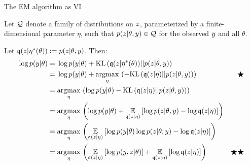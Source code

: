 \begin{frame}{The EM algorithm as VI}

Let $\mathcal{Q}$ denote a family of distributions on $z$, parameterized by a
finite-dimensional parameter $\eta$, such that $p(z | \theta, y) \in \mathcal{Q}$
for the observed $y$ and all $\theta$.

Let $\mathfrak{q}(z | \eta^{*}(\theta)) := p(z | \theta, y)$.  Then:
%
\begin{align*}
%
\log p(\y | \theta) ={}&
\log p(\y | \theta) + \kl{\q(\z | \etaopt(\theta))}{p(\z | \theta, \y)}
\\={}&
\log p(\y | \theta) + \argmax{\eta}\left( -
    \kl{\q(\z | \eta)}{p(\z | \theta, \y)} \right) & \bigstar
\\={}&
\argmax{\eta} \left(
    \log p(\y | \theta) -
    \kl{\q(\z | \eta)}{p(\z | \theta, \y)}\right)
\\={}&
\argmax{\eta} \left(
\log p(\y | \theta) +
\expect{\q(\z | \eta)}{
    \log p(\z | \theta, \y) - \log \q(\z | \eta)
}\right)
\\={}&
\argmax{\eta} \left(
\expect{\q(\z | \eta)}{
    \log p(\y | \theta)
    \log p(\z | \theta, \y) -  \log \q(\z | \eta)
}\right)
\\={}&
\argmax{\eta} \left(
\expect{\q(\z | \eta)}{
    \log p(\y, \z | \theta) }
+ \expect{\q(\z | \eta)}{\log \q(\z | \eta)
}\right) & \bigstar\bigstar
%
\end{align*}
%
\end{frame}





